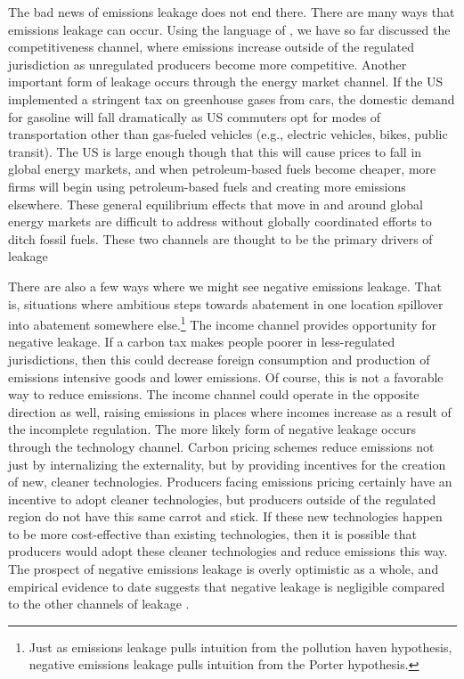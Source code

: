 The bad news of emissions leakage does not end there. There are many ways that emissions leakage can occur. Using the language of \cite{cosbey2020developing}, we have so far discussed the competitiveness channel, where emissions increase outside of the regulated jurisdiction as unregulated producers become more competitive. Another important form of leakage occurs through the energy market channel. If the US implemented a stringent tax on greenhouse gases from cars, the domestic demand for gasoline will fall dramatically as US commuters opt for modes of transportation other than gas-fueled vehicles (e.g., electric vehicles, bikes, public transit). The US is large enough though that this will cause prices to fall in global energy markets, and when petroleum-based fuels become cheaper, more firms will begin using petroleum-based fuels and creating more emissions elsewhere. These general equilibrium effects that move in and around global energy markets are difficult to address without globally coordinated efforts to ditch fossil fuels. These two channels are thought to be the primary drivers of leakage \citep{branger2014climate}

There are also a few ways where we might see negative emissions leakage. That is, situations where ambitious steps towards abatement in one location spillover into abatement somewhere else.\footnote{Just as emissions leakage pulls intuition from the pollution haven hypothesis, negative emissions leakage pulls intuition from the Porter hypothesis.} The income channel provides opportunity for negative leakage. If a carbon tax makes people poorer in less-regulated jurisdictions, then this could decrease foreign consumption and production of emissions intensive goods and lower emissions. Of course, this is not a favorable way to reduce emissions. The income channel could operate in the opposite direction as well, raising emissions in places where incomes increase as a result of the incomplete regulation. The more likely form of negative leakage occurs through the technology channel. Carbon pricing schemes reduce emissions not just by internalizing the externality, but by providing incentives for the creation of new, cleaner technologies. Producers facing emissions pricing certainly have an incentive to adopt cleaner technologies, but producers outside of the regulated region do not have this same carrot and stick. If these new technologies happen to be more cost-effective than existing technologies, then it is possible that producers would adopt these cleaner technologies and reduce emissions this way. The prospect of negative emissions leakage is overly optimistic as a whole, and empirical evidence to date suggests that negative leakage is negligible compared to the other channels of leakage \citep{winchester2013numerical}.

